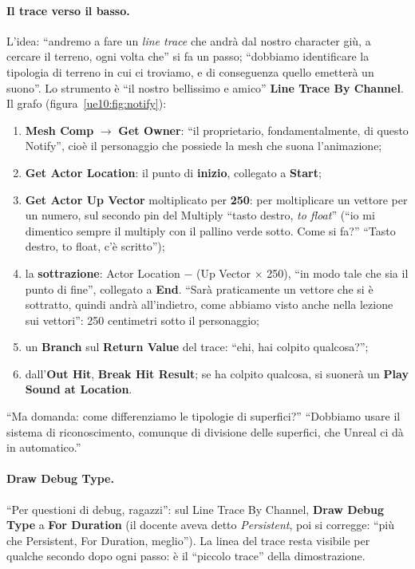 \paragraph{Il trace verso il basso.} L'idea: ``andremo a fare un \emph{line trace} che
andrà dal nostro character giù, a cercare il terreno, ogni volta che'' si fa un passo;
``dobbiamo identificare la tipologia di terreno in cui ci troviamo, e di conseguenza quello
emetterà un suono''. Lo strumento è ``il nostro bellissimo e amico'' \textbf{Line Trace By
Channel}. Il grafo (figura~\ref{ue10:fig:notify}):
\begin{enumerate}
  \item \textbf{Mesh Comp} $\rightarrow$ \textbf{Get Owner}: ``il proprietario,
        fondamentalmente, di questo Notify'', cioè il personaggio che possiede la mesh
        che suona l'animazione;
  \item \textbf{Get Actor Location}: il punto di \textbf{inizio}, collegato a
        \textbf{Start};
  \item \textbf{Get Actor Up Vector} moltiplicato per \textbf{250}: per moltiplicare un
        vettore per un numero, sul secondo pin del Multiply ``tasto destro, \emph{to
        float}'' (``io mi dimentico sempre il multiply con il pallino verde sotto. Come si
        fa?'' ``Tasto destro, to float, c'è scritto'');
  \item la \textbf{sottrazione}: Actor Location $-$ (Up Vector $\times$ 250), ``in modo
        tale che sia il punto di fine'', collegato a \textbf{End}. ``Sarà praticamente un
        vettore che si è sottratto, quindi andrà all'indietro, come abbiamo visto anche
        nella lezione sui vettori'': 250 centimetri sotto il personaggio;
  \item un \textbf{Branch} sul \textbf{Return Value} del trace: ``ehi, hai colpito
        qualcosa?'';
  \item dall'\textbf{Out Hit}, \textbf{Break Hit Result}; se ha colpito qualcosa, si
        suonerà un \textbf{Play Sound at Location}.
\end{enumerate}
``Ma domanda: come differenziamo le tipologie di superfici?'' ``Dobbiamo usare il sistema
di riconoscimento, comunque di divisione delle superfici, che Unreal ci dà in
automatico.''

\paragraph{Draw Debug Type.} ``Per questioni di debug, ragazzi'': sul Line Trace By
Channel, \textbf{Draw Debug Type} a \textbf{For Duration} (il docente aveva detto
\emph{Persistent}, poi si corregge: ``più che Persistent, For Duration, meglio''). La
linea del trace resta visibile per qualche secondo dopo ogni passo: è il ``piccolo trace''
della dimostrazione.

